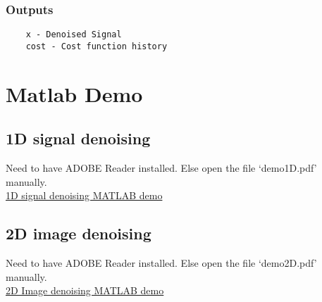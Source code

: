\documentclass[11pt]{article}
\begin{document}
\subsubsection{Outputs}
\begin{verbatim}
    x - Denoised Signal
    cost - Cost function history
\end{verbatim}
\section{Matlab Demo}
\label{Examples}
\subsection{1D signal denoising}
Need to have ADOBE Reader installed. Else open the file `demo1D.pdf' manually. \\
\href{run:demo1D.pdf}{1D signal denoising MATLAB demo}
\subsection{2D image denoising}

Need to have ADOBE Reader installed. Else open the file `demo2D.pdf' manually. \\
\href{run:demo2D.pdf}{2D Image denoising MATLAB demo}
\end{document}
